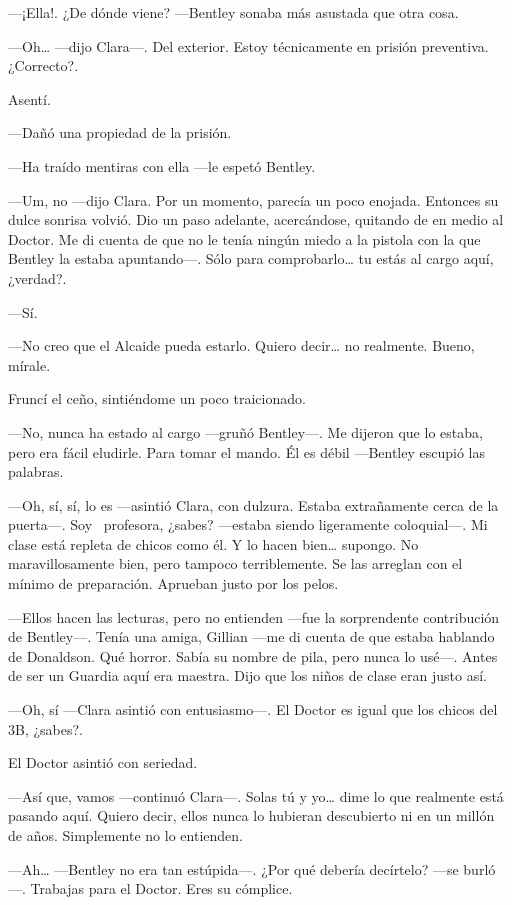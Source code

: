 ---¡Ella!. ¿De dónde viene? ---Bentley sonaba más asustada que otra
cosa.

---Oh\ldots{} ---dijo Clara---. Del exterior. Estoy técnicamente en
prisión preventiva. ¿Correcto?.

Asentí.

---Dañó una propiedad de la prisión.

---Ha traído mentiras con ella ---le espetó Bentley.

---Um, no ---dijo Clara. Por un momento, parecía un poco enojada.
Entonces su dulce sonrisa volvió. Dio un paso adelante, acercándose,
quitando de en medio al Doctor. Me di cuenta de que no le tenía ningún
miedo a la pistola con la que Bentley la estaba apuntando---. Sólo para
comprobarlo\ldots{} tu estás al cargo aquí, ¿verdad?.

---Sí.

---No creo que el Alcaide pueda estarlo. Quiero decir\ldots{} no
realmente. Bueno, mírale.

Fruncí el ceño, sintiéndome un poco traicionado.

---No, nunca ha estado al cargo ---gruñó Bentley---. Me dijeron que lo
estaba, pero era fácil eludirle. Para tomar el mando. Él es débil
---Bentley escupió las palabras.

---Oh, sí, sí, lo es ---asintió Clara, con dulzura. Estaba extrañamente
cerca de la puerta---. Soy ~profesora, ¿sabes? ---estaba siendo
ligeramente coloquial---. Mi clase está repleta de chicos como él. Y lo
hacen bien\ldots{} supongo. No maravillosamente bien, pero tampoco
terriblemente. Se las arreglan con el mínimo de preparación. Aprueban
justo por los pelos.

---Ellos hacen las lecturas, pero no entienden ---fue la sorprendente
contribución de Bentley---. Tenía una amiga, Gillian ---me di cuenta de
que estaba hablando de Donaldson. Qué horror. Sabía su nombre de pila,
pero nunca lo usé---. Antes de ser un Guardia aquí era maestra. Dijo que
los niños de clase eran justo así.

---Oh, sí ---Clara asintió con entusiasmo---. El Doctor es igual que los
chicos del 3B, ¿sabes?.

El Doctor asintió con seriedad.

---Así que, vamos ---continuó Clara---. Solas tú y yo\ldots{} dime lo
que realmente está pasando aquí. Quiero decir, ellos nunca lo hubieran
descubierto ni en un millón de años. Simplemente no lo entienden.

---Ah\ldots{} ---Bentley no era tan estúpida---. ¿Por qué debería
decírtelo? ---se burló---. Trabajas para el Doctor. Eres su cómplice.


